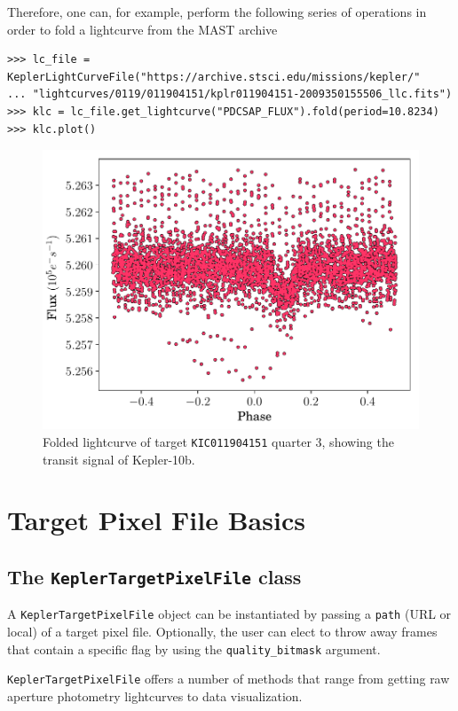 \documentclass{article}
\begin{document}
        Therefore, one can, for example, perform the following series of operations
        in order to fold a lightcurve from the MAST archive
\begin{verbatim}
>>> lc_file = KeplerLightCurveFile("https://archive.stsci.edu/missions/kepler/"
... "lightcurves/0119/011904151/kplr011904151-2009350155506_llc.fits")
>>> klc = lc_file.get_lightcurve("PDCSAP_FLUX").fold(period=10.8234)
>>> klc.plot()
\end{verbatim}
        \begin{figure}[!htb]
            \centering
            \includegraphics[scale=.5]{figs/fold-lc.pdf}
            \caption{Folded lightcurve of target \texttt{KIC011904151} quarter 3, showing the
            transit signal of Kepler-10b.}
            \label{fig:fold-method}
        \end{figure}

\section{Target Pixel File Basics}
    \subsection{The \texttt{KeplerTargetPixelFile} class}
        A \texttt{KeplerTargetPixelFile} object can be instantiated
        by passing a \texttt{path} (URL or local) of a target pixel file.
        Optionally, the user can elect to throw away frames that contain
        a specific flag by using the \texttt{quality\_bitmask} argument.

        \texttt{KeplerTargetPixelFile} offers a number of methods
        that range from getting raw aperture photometry lightcurves to
        data visualization.
\end{document}
